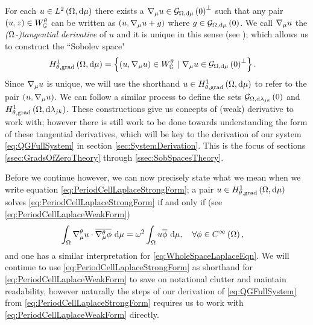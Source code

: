 For each $u\in L^{2}\left( \Omega,\mathrm{d}\mu \right)$ there exists a $\nabla_\mu u\in\mathcal{G}_{ \Omega, \mathrm{d}\mu}\left( 0 \right)^{\perp}$ such that any pair $\left( u,z \right)\in W^{\theta}_{\mathbb{G}}$ can be written as $\left( u,\nabla_\mu u + g \right)$ where $g\in\mathcal{G}_{ \Omega, \mathrm{d}\mu}\left( 0 \right)$.
We call $\nabla_\mu u$ the \emph{($\Omega$-)tangential derivative} of $u$ and it is unique in this sense (see ); which allows us to construct the ``Sobolev space"
\begin{align*}
	H^1_{\theta, \mathrm{grad}}\left( \Omega, \mathrm{d}\mu \right) &= \left\{  \left( u, \nabla_\mu u \right)\in W^{\theta}_{\mathbb{G}} \ \vert \ \nabla_\mu u \in \mathcal{G}_{ \Omega, \mathrm{d}\mu}\left( 0 \right)^{\perp}  \right\}.
\end{align*}
Since $\nabla_\mu u$ is unique, we will use the shorthand $u\in H^1_{\theta, \mathrm{grad}}\left( \Omega, \mathrm{d}\mu \right)$ to refer to the pair $\left( u, \nabla_\mu u \right)$. 
We can follow a similar process to define the sets $\mathcal{G}_{ \Omega, \mathrm{d}\lambda_{jk}}\left( 0 \right)$ and $H^1_{\theta, \mathrm{grad}}\left( \Omega, \mathrm{d}\lambda_{jk} \right)$. 
These constructions give us concepts of (weak) derivative to work with; however there is still work to be done towards understanding the form of these tangential derivatives, which will be key to the derivation of our system \eqref{eq:QGFullSystem} in section \ref{sec:SystemDerivation}.
This is the focus of sections \ref{ssec:GradsOfZeroTheory} through \ref{ssec:SobSpacesTheory}. \newline

Before we continue however, we can now precisely state what we mean when we write equation \eqref{eq:PeriodCellLaplaceStrongForm}; a pair $u\in H^1_{\theta, \mathrm{grad}}\left( \Omega, \mathrm{d}\mu \right)$ solves \eqref{eq:PeriodCellLaplaceStrongForm} if and only if (see \eqref{eq:PeriodCellLaplaceWeakForm})
\begin{align*}
	\int_{\Omega}\nabla^{\theta}_{\mu}u\cdot\overline{\nabla^{\theta}_{\mu}\phi} \ \mathrm{d}\mu &= \omega^2\int_{\Omega}u\overline{\phi} \ \mathrm{d}\mu, \quad\forall \phi\in C^{\infty}\left( \Omega \right),
\end{align*}
and one has a similar interpretation for \eqref{eq:WholeSpaceLaplaceEqn}.
We will continue to use \eqref{eq:PeriodCellLaplaceStrongForm} as shorthand for \eqref{eq:PeriodCellLaplaceWeakForm} to save on notational clutter and maintain readability, however naturally the steps of our derivation of \eqref{eq:QGFullSystem} from \eqref{eq:PeriodCellLaplaceStrongForm} requires us to work with \eqref{eq:PeriodCellLaplaceWeakForm} directly.


